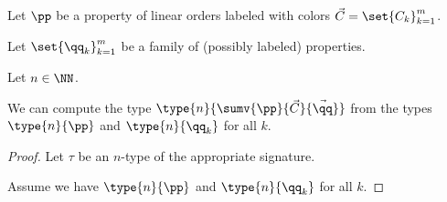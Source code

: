 \begin{corollary}
  Let $\pp$ be a property of linear orders
  labeled with colors $\vec{C} = \set{C_k}_{k=1}^m$.

  Let $\set {\qq_k}_{k=1}^m$ be a family of (possibly labeled) properties.

  Let $n \in \NN$.

  We can compute the type $\type{n}{\sumv{\pp}{\vec{C}}{\vec{\qq}}}$
  from the types $\type{n}{\pp}$ and $\type{n}{\qq_k}$ for all $k$.
\end{corollary}

\begin{proof}
  Let $\tau$ be an $n$-type of the appropriate signature.
  
  Assume we have $\type{n}{\pp}$ and $\type{n}{\qq_k}$ for all $k$.

  

\end{proof}